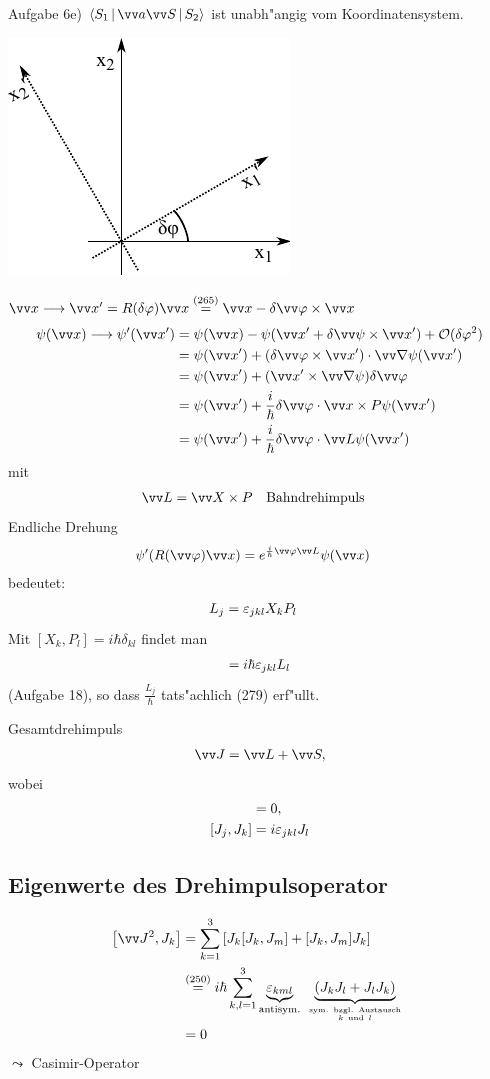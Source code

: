 \documentclass[a4paper]{scrartcl}
\newcommand{\eps}{\ensuremath \varepsilon}
\renewcommand{\phi}{\ensuremath \varphi}
\newcommand{\eqn}[1]{\begin{align} #1 \end{align}}
\newcommand{\eqnnon}[1]{\begin{align*} #1 \end{align*}}
\begin{document}
{Aufgabe 6e) $\Braket{ S_1 | \vv a \vv S | S_2 }$ ist unabh"angig vom Koordinatensystem.
\begin{center}
\includegraphics{283Drehung}
\end{center}
$\vv x \longrightarrow \vv x ' = R( \delta \phi) \vv x \stackrel{(265)}= \vv x - \delta \vv \phi \times \vv x$
\eqnnon{
\psi(\vv x) \longrightarrow \psi'(\vv x') & = \psi( \vv x) - \psi(\vv x' + \delta \vv \psi \times \vv x') + \mathcal O ( \delta \phi^2) \\
& = \psi( \vv x') + ( \delta \vv \phi \times \vv x') \cdot \vv \nabla \psi( \vv x') \\
& = \psi( \vv x') + ( \vv x' \times \vv \nabla \psi) \delta \vv \phi \\
& = \psi( \vv x') + \frac i \hbar \delta \vv \phi \cdot \vv x  \times P \psi ( \vv x') \\
& = \psi( \vv x ') + \frac i \hbar \delta \vv \phi \cdot \vv L \psi( \vv x')
}
mit
\eqn{ \vv L & = \vv X \times P \mathrm{ \quad Bahndrehimpuls}}
Endliche Drehung
\eqn{ \psi'( R( \vv \phi) \vv x) & = e^{\frac i \hbar \vv \phi \vv L} \psi( \vv x) }
bedeutet:
\eqn{ L_j & = \eps_{jkl} X_k P_l}
Mit $[X_k, P_l] = i \hbar \delta_{kl}$ findet man
\eqn{ [L_j, L_k] = i \hbar \eps_{jkl} L_l}
(Aufgabe 18), so dass $\frac{L_j}\hbar$ tats"achlich (279) erf"ullt.

Gesamtdrehimpuls
\eqn{ \vv J = \vv L + \vv S,}
wobei
\eqn{ [L_j, S_k ] & = 0, \\
[J_j, J_k] & = i \eps_{jkl} J_l}

\subsection{Eigenwerte des Drehimpulsoperator}
\eqn{
\begin{split}
\left[ \vv J ^2, J_k \right] & = \sum_{k=1}^3 \left[ J_k [J_k, J_m] +[J_k, J_m] J_k \right] \\
& \stackrel{(250)}= i \hbar \sum_{k,l=1}^3 \underbrace{ \eps_{kml}}_{\mathrm{antisym.}} \underbrace{ (J_k J_l + J_l J_k)}_{\mathrm{\ sym. \ bzgl. \ Austausch \ } \atop k \mathrm{ \ und \ } l} \\
& = 0 
\end{split}
}
$\leadsto$ Casimir-Operator

}
\end{document}
